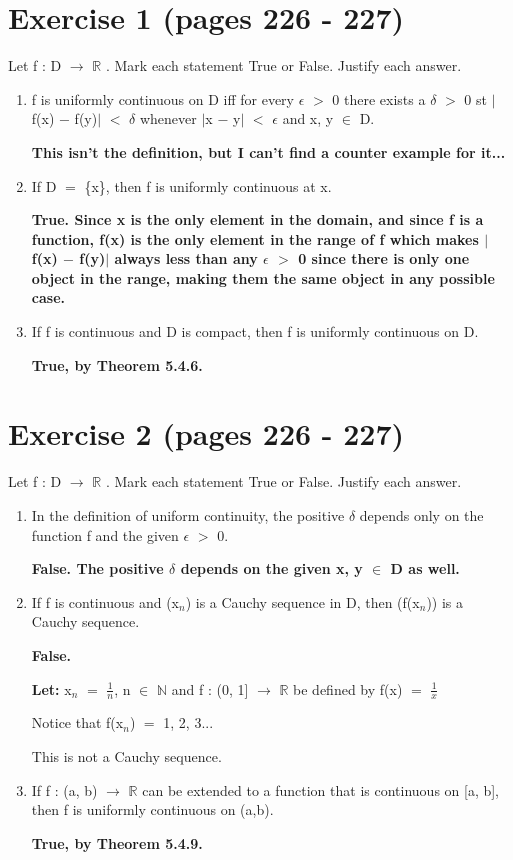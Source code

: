 \documentclass{article}
\newcommand{\mt}[1]{\ensuremath{#1}}
\newcommand\bsc[2][\DefaultOpt]{%
  \def\DefaultOpt{#2}%
  \section[#1]{#2}%
}
\newcommand{\balist}{\begin{enumerate}[label=\alph*.]}
\newcommand{\elist}{\end{enumerate}}
\newcommand{\lt}[1]{\textbf{Let: } #1}
\newcommand{\br}{\mt{\mathbb{R}} }       %
\newcommand{\bn}{\mt{\mathbb{N}} }       %
\newcommand{\ep}{\mt{\epsilon} }         %
\newcommand{\dta}{\mt{\delta} }
\newcommand{\mem}{\mt{\in} }
\newcommand{\lra}{ \mt{\longrightarrow} } %
\newcommand{\av}[1]{\mt{|}#1\mt{|}}  %
\newcommand{\bk}[1]{\{#1\}}
\newcommand{\ms}{\mt{-} }
\newcommand{\ls}{\mt{<} }
\newcommand{\gr}{\mt{>} }
\newcommand{\eql}{\mt{=} }
\newcommand{\uw}[2]{#1\mt{_{#2}}}
\newcommand{\frc}[2]{\mt{\frac{#1}{#2}}}
\begin{document}
\bsc{Exercise 1 (pages 226 - 227)}{

Let f : D \lra \br. Mark each statement True or False. Justify each answer.

\balist
\item f is uniformly continuous on D iff for every \ep \gr 0 there exists a \dta \gr 0 st \av{f(x) \ms f(y)} \ls \dta whenever \av{x \ms y} \ls \ep and x, y \mem D.

\textbf{This isn't the definition, but I can't find a counter example for it...}

\item If D \eql \bk{x}, then f is uniformly continuous at x.
	
\textbf{True. Since x is the only element in the domain, and since f is a function, f(x) is the only element in the range of f which makes \av{f(x) \ms f(y)} always less than any \ep \gr 0 since there is only one object in the range, making them the same object in any possible case.}
	
\item If f is continuous and D is compact, then f is uniformly continuous on D.
	
	\textbf{True, by Theorem 5.4.6.}

\elist
}

\bsc{Exercise 2 (pages 226 - 227)}{
Let f : D \lra \br. Mark each statement True or False. Justify each answer.
\balist
\item In the definition of uniform continuity, the positive \dta depends only on the function f and the given \ep \gr 0.

\textbf{False. The positive \dta depends on the given x, y \mem D as well.}

\item If f is continuous and (\uw{x}{n}) is a Cauchy sequence in D, then (f(\uw{x}{n})) is a Cauchy sequence.

\textbf{False.}

\lt{\uw{x}{n} \eql \frc{1}{n}, n \mem \bn and f : (0, 1] \lra \br be defined by f(x) \eql \frc{1}{x}}

Notice that f(\uw{x}{n}) \eql 1, 2, 3...

This is not a Cauchy sequence.

\item If f : (a, b) \lra \br can be extended to a function that is continuous on [a, b], then f is uniformly continuous on (a,b).

\textbf{True, by Theorem 5.4.9.}

\elist
}
\end{document}
